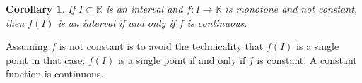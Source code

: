 \documentclass[12pt]{book}
\newcommand{\R}{{\mathbb{R}}}
\theoremstyle{plain}
\newtheorem{cor}[thm]{Corollary}
\theoremstyle{remark}
\theoremstyle{definition}
\theoremstyle{exercise}
\theoremstyle{example}
\begin{document}
%
%
%
%
%

\begin{cor} \label{cor:continterval}
If $I \subset \R$ is an interval and $f \colon I \to \R$ is 
monotone and not constant, then $f(I)$ is an interval if and only if $f$
is continuous.
\end{cor}

Assuming $f$ is not constant is to avoid the technicality
that $f(I)$ is a single point in that case; $f(I)$ is a single
point if and only if $f$ is constant.  A constant function is 
continuous.
\end{document}
